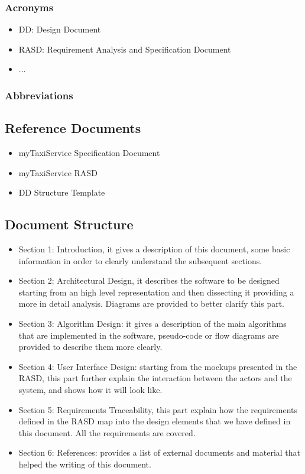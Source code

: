 \subsubsection{Acronyms}
\begin{itemize}
	\item DD: Design Document
	\item RASD: Requirement Analysis and Specification Document
	\item ...
\end{itemize}
\subsubsection{Abbreviations}
\subsection{Reference Documents}
\begin{itemize}
	\item myTaxiService Specification Document
	\item myTaxiService RASD
	\item DD Structure Template
\end{itemize}
\subsection{Document Structure}
\begin{itemize}
	\item Section 1: Introduction, it gives a description of this document, some basic information in order to clearly understand the subsequent sections.
	\item Section 2: Architectural Design, it describes the software to be designed starting from an high level representation and then dissecting it providing a more in detail analysis. Diagrams are provided to better clarify this part.
	\item Section 3: Algorithm Design: it gives a description of the main algorithms that are implemented in the software, pseudo-code or flow diagrams are provided to describe them more clearly.
	\item Section 4: User Interface Design: starting from the mockups presented in the RASD, this part further explain the interaction between the actors and the system, and shows how it will look like.
	\item Section 5: Requirements Traceability, this part explain how the requirements defined in the RASD map into the design elements that we have defined in this document. All the requirements are covered.
	\item Section 6: References: provides a list of external documents and material that helped the writing of this document.
\end{itemize}